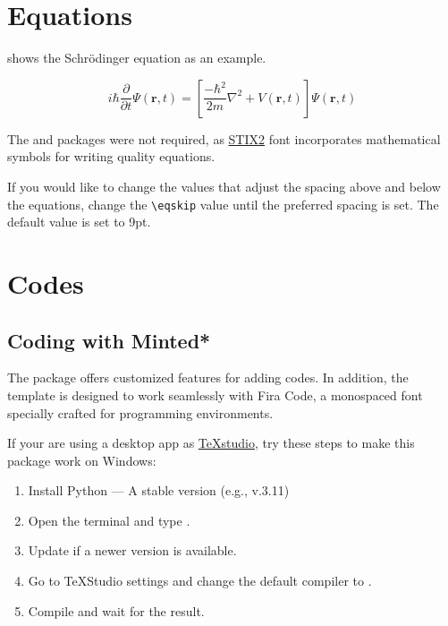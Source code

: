 \documentclass[9pt,a4paper,twocolumn,twoside]{rho-class/rho}
\begin{document}
\section{Equations}

	 shows the Schrödinger equation as an example. 

    \begin{equation}\label{eq:equation}
        i\hbar \frac{\partial }{\partial t}\Psi(\mathbf{r},t) = \left[\frac{-\hbar^2}{2m}\nabla^2 + V(\mathbf{r},t) \right]\Psi(\mathbf{r},t)
    \end{equation}
	
	The  and  packages were not required, as \href{https://ctan.org/pkg/stix2-otf/}{STIX2} font incorporates mathematical symbols for writing quality equations.
	
	\begin{note}
		If you would like to change the values that adjust the spacing above and below the equations, change the \verb|\eqskip| value until the preferred spacing is set. The default value is set to 9pt.
	\end{note}

\section{Codes}

	\subsection{Coding with Minted*}
	
		The  package offers customized features for adding codes. In addition, the template is designed to work seamlessly with Fira Code, a monospaced font specially crafted for programming environments.

        If your are using a desktop app as \href{https://www.texstudio.org/}{TeXstudio}, try these steps to make this package work on Windows:
		
		\begin{enumerate}
			\item Install Python — A stable version (e.g., v.3.11)
			\item Open the terminal and type .
			\item Update if a newer version is available.
			\item Go to TeXStudio settings and change the default compiler to .
			\item Compile and wait for the result.
		\end{enumerate}
        
\end{document}
